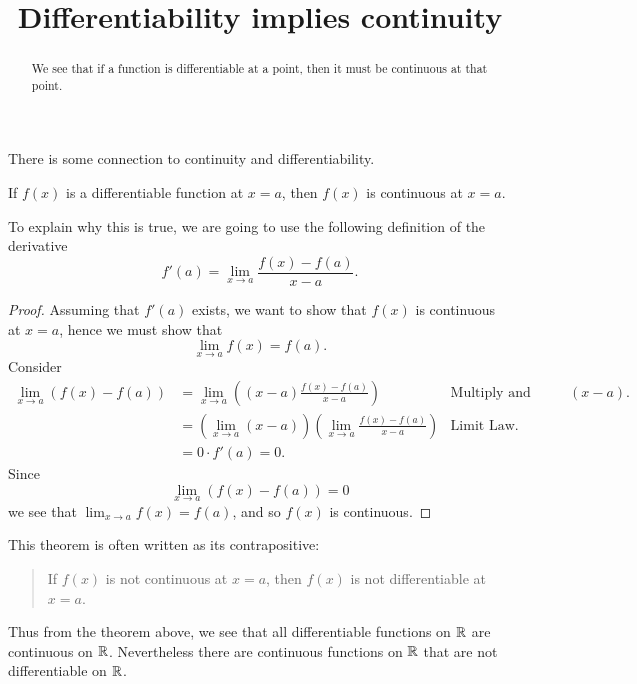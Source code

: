 \documentclass{ximera}
\title[Dig-In:]{Differentiability implies continuity}
\begin{document}
\begin{abstract}
We see that if a function is differentiable at a point, then it must
be continuous at that point.
\end{abstract}
\maketitle

There is some connection to continuity and differentiability.

\begin{theorem}
If $f(x)$ is a differentiable function at $x = a$, then $f(x)$ is
continuous at $x=a$.
\end{theorem}

To explain why this is true, we are going to use the following
definition of the derivative
\[
f'(a) = \lim_{x\to a} \frac{f(x)-f(a)}{x-a}.
\]
\begin{proof}
Assuming that $f'(a)$ exists, we want to show that $f(x)$ is
continuous at $x=a$, hence we must show that
\[
\lim_{x\to a} f(x) = f(a).
\]
Consider
\begin{align*}
\lim_{x\to a} \left(f(x) - f(a)\right) &= \lim_{x\to a} \left((x-a)\frac{f(x) - f(a)}{x-a}\right) &\text{Multiply and divide by $(x-a)$.} \\
&= \left(\lim_{x\to a} (x-a) \right) \left(\lim_{x\to a}\frac{f(x) - f(a)}{x-a}\right) &\text{Limit Law.} \\
&= 0\cdot f'(a) = 0.
\end{align*}
Since 
\[
\lim_{x\to a}\left(f(x) - f(a)\right) = 0 
\]
we see that $\lim_{x\to a} f(x) = f(a)$, and so $f(x)$ is continuous.
\end{proof}

This theorem is often written as its contrapositive:
\begin{quote}
If $f(x)$ is not continuous at $x=a$, then $f(x)$ is not
differentiable at $x=a$.
\end{quote}


Thus from the theorem above, we see that all differentiable functions
on $\mathbb R$ are continuous on $\mathbb R$. Nevertheless there are continuous
functions on $\mathbb R$ that are not differentiable on $\mathbb R$.

\end{document}

